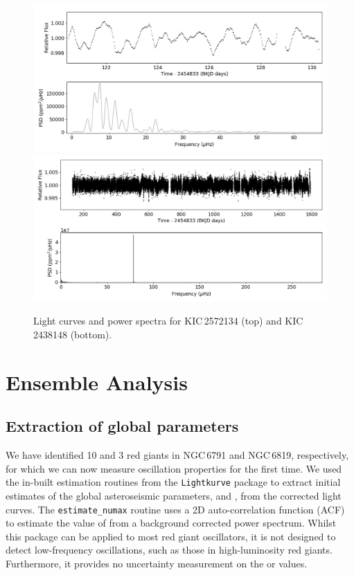 \begin{figure}
    \centering
    \includegraphics[width=0.9\linewidth]{Chapter5/2572134_lc_ps.png}
    \includegraphics[width=0.9\linewidth]{Chapter5/2438148_lc_ps.png}
    \caption[Light curves and power spectra for KIC\,2572134 and KIC\,2438148]{Light curves and power spectra for KIC\,2572134 (top) and KIC\,2438148 (bottom).}
    \label{fig:weirdvars}
\end{figure}

\section{Ensemble Analysis}

\subsection{Extraction of global parameters}
We have identified 10 and 3 red giants in NGC\,6791 and NGC\,6819, respectively, for which we can now measure oscillation properties for the first time. We used the in-built estimation routines from the \texttt{Lightkurve} package to extract initial estimates of the global asteroseismic parameters, \numax{} and \dnu{}, from the corrected light curves. The \texttt{estimate\_numax} routine uses a 2D auto-correlation function (ACF) to estimate the value of \numax{} from a background corrected power spectrum. Whilst this package can be applied to most red giant oscillators, it is not designed to detect low-frequency oscillations, such as those in high-luminosity red giants. Furthermore, it provides no uncertainty measurement on the \numax{} or \dnu{} values.

